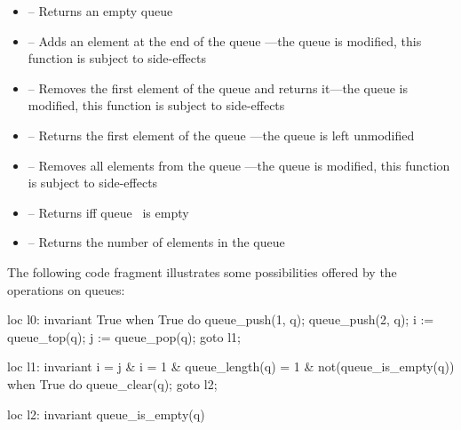 \begin{itemize}
	\item {} -- Returns an empty queue

	\item \label{item:lbl-queue_push}  -- Adds an element  at the end of the queue ---the queue is modified, this function is subject to side-effects

	\item \label{item:lbl-queue_pop}  -- Removes the first element of the queue  and returns it---the queue is modified, this function is subject to side-effects

	\item \label{item:lbl-queue_top}  -- Returns the first element of the queue ---the queue is left unmodified

	\item \label{item:lbl-queue_clear}  -- Removes all elements from the queue ---the queue is modified, this function is subject to side-effects

	\item \label{item:lbl-queue_is_empty}  -- Returns  iff queue~ is empty

	\item \label{item:lbl-queue_length}  -- Returns the number of elements in the queue 
\end{itemize}

\begin{example}
	The following code fragment illustrates some possibilities offered by the operations on queues:

\begin{IMITATORmodel}
loc l0: invariant True
	when True do {
		queue_push(1, q);
		queue_push(2, q);
		i := queue_top(q);
		j := queue_pop(q);
	} goto l1;

loc l1: invariant
	i = j
	& i = 1
	& queue_length(q) = 1
	& not(queue_is_empty(q))
	when True do { queue_clear(q); } goto l2;

loc l2: invariant queue_is_empty(q)
\end{IMITATORmodel}

\end{example}


